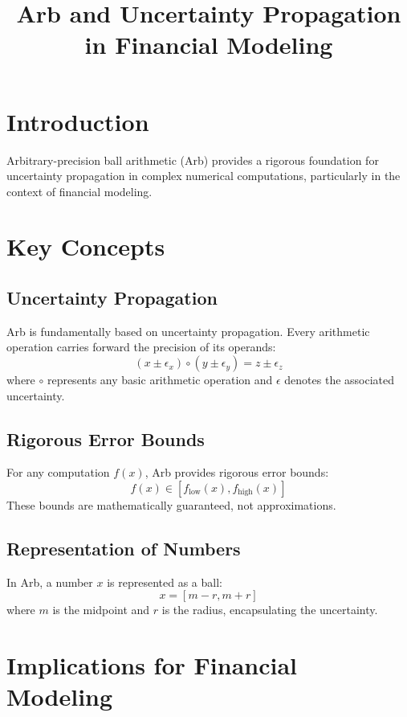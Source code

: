\documentclass{article}
\newcommand{\tmop}[1]{\ensuremath{\operatorname{#1}}}
\begin{document}
\title{Arb and Uncertainty Propagation in Financial Modeling}

\date{}

\maketitle

\section{Introduction}

Arbitrary-precision ball arithmetic (Arb) provides a rigorous foundation for
uncertainty propagation in complex numerical computations, particularly in the
context of financial modeling.

\section{Key Concepts}

\subsection{Uncertainty Propagation}

Arb is fundamentally based on uncertainty propagation. Every arithmetic
operation carries forward the precision of its operands:
\[ (x \pm \epsilon_x) \circ (y \pm \epsilon_y) = z \pm \epsilon_z \]
where $\circ$ represents any basic arithmetic operation and $\epsilon$ denotes
the associated uncertainty.

\subsection{Rigorous Error Bounds}

For any computation $f (x)$, Arb provides rigorous error bounds:
\[ f (x) \in [f_{\tmop{low}} (x), f_{\tmop{high}} (x)] \]
These bounds are mathematically guaranteed, not approximations.

\subsection{Representation of Numbers}

In Arb, a number $x$ is represented as a ball:
\[ x = [m - r, m + r] \]
where $m$ is the midpoint and $r$ is the radius, encapsulating the
uncertainty.

\section{Implications for Financial Modeling}
\end{document}
